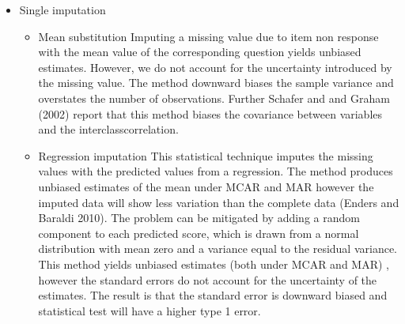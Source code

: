 \begin{itemize} 
\item Single imputation
\begin{itemize}
\item Mean substitution
Imputing a missing value due to item non response with the mean value of the corresponding question yields unbiased estimates. However, we do not account for the uncertainty introduced by the missing value. The method downward biases the sample variance and  overstates the number of observations. Further Schafer and and Graham (2002) report that this method biases the covariance between variables and the interclasscorrelation. 
\item  Regression imputation
This statistical technique imputes the missing values with the predicted values from a regression. The method produces unbiased estimates of the mean under MCAR and MAR however the imputed data will show less variation than the complete data (Enders and Baraldi 2010). The problem can be mitigated by adding a random component to each predicted score, which is drawn from a normal distribution with mean zero and a variance equal to the residual variance. This method yields unbiased estimates (both under MCAR and MAR) , however the standard errors do not account for the uncertainty of the estimates. The result is that the standard error is downward biased and statistical test will have a higher type 1 error. 
 \end{itemize}  

\end{itemize}  
